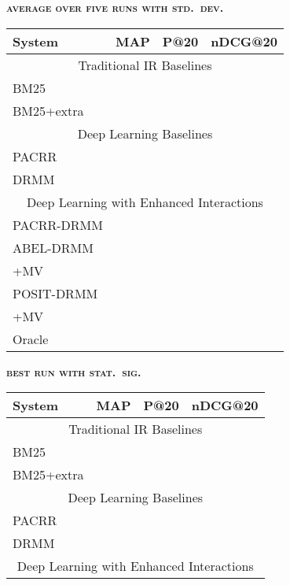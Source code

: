 \documentclass[11pt,a4paper]{article}
\begin{document}
\begin{table*}[t]
\footnotesize
\begin{minipage}{3.15in}
\begin{center}
\textbf{\textsc{{\normalsize average over five runs with std.\ dev.}}}\\
\vspace{0.2em}
\begin{tabular}{|llll|}
\hline
{\bf System}& {\bf MAP}    & {\bf P@20}   & {\bf nDCG@20} \\ \hline
\multicolumn{4}{|c|}{Traditional IR Baselines} \\ \hline
BM25        &  &  &  \\
BM25+extra  &  &  &  \\ \hline
\multicolumn{4}{|c|}{Deep Learning Baselines} \\ \hline
PACRR       &  &  &  \\
DRMM        &  &  &  \\ \hline
\multicolumn{4}{|c|}{Deep Learning with Enhanced Interactions} \\ \hline
PACRR-DRMM  &  &  &  \\
ABEL-DRMM   &  &  &  \\
+MV  &  &  & \\
POSIT-DRMM  &  &  &  \\
+MV  &  &  &  \\ \hline\hline
Oracle      &  &  &  \\ \hline
\end{tabular}
\end{center}
\end{minipage}
\begin{minipage}{3.1in}
\begin{center}
\textbf{\textsc{{\normalsize best run with stat.\ sig.}}}\\
\vspace{0.2em}
\begin{tabular}{|llll|}
\hline
{\bf System}& {\bf MAP}    & {\bf P@20}   & {\bf nDCG@20} \\ \hline
\multicolumn{4}{|c|}{Traditional IR Baselines} \\ \hline
BM25        &  &  &  \\
BM25+extra  &  &  &  \\ \hline
\multicolumn{4}{|c|}{Deep Learning Baselines} \\ \hline
PACRR       &  &  &  \\
DRMM        &  &  &  \\ \hline
\multicolumn{4}{|c|}{Deep Learning with Enhanced Interactions} \\ \hline

\end{tabular}
\end{center}
\end{minipage}
\end{table*}
\end{document}
